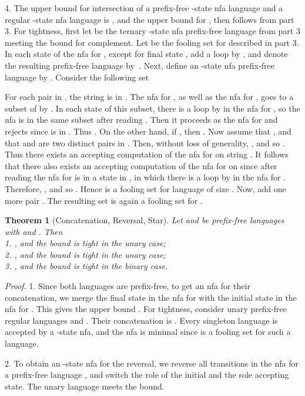 \documentclass[copyright]{eptcs}
\newtheorem{theorem}{Theorem}
\begin{document}
\label{part4}
  4. The upper bound 
  for intersection of a  prefix-free -state nfa language 
  and a  regular -state nfa language
  is , and 
  the upper bound for 
  , then follows from part 3.
  For tightness, first let  be the ternary -state nfa 
  prefix-free language from part 3 meeting the bound  for complement.
  Let  be the fooling set for  described in part 3.
  In each state of the nfa for , except for final state ,
  add a loop by , and denote the resulting prefix-free language by~.
  Next, define an -state nfa prefix-free language 
  by .
  Consider the following set 
  
  For each pair in  ,
  the string  is in  .
  The nfa for , as well as the nfa for ,
  goes to a subset of  by .
  In each state of this subset, there is a loop by  in the nfa for ,
  so the nfa is in the same subset after reading .
  Then it proceeds as the nfa for  and rejects since  is in .
  Thus  . 
  On the other hand, if ,
  then  .
  Now assume that , and that  
  and  are two distinct pairs in .
  Then, without loss of generality, , and so .
  Thus there exists an accepting computation of the nfa for  on  string .
  It follows that there also exists an accepting computation 
  of the nfa for  on 
  since after reading  the nfa for  is in a state in ,
  in which there is a loop by  in the nfa for .
  Therefore,  , and so  .
  Hence  
  is a fooling set for language  of size .
  Now, add one more pair  .
  The resulting set is again a fooling set for .
 \hfill

 \begin{theorem}[Concatenation, Reversal, Star]\label{thm:con,rev,star}
  Let   and 
  be  prefix-free  languages  with  and .
  Then \\
  1. , and the bound is tight in the unary case; \\
  2. , and the bound is tight in the unary case;\\
  3. , and the bound is tight in the binary case.
 \end{theorem}

 \noindent\emph{Proof.}
  1. Since both languages are prefix-free,
  to get an nfa for their concatenation,
  we  merge the final state in the nfa for 
  with the initial state  in the nfa for .
  This gives the upper bound .
  For tightness, consider unary  prefix-free regular languages 
   and .
  Their concatenation  is .
  Every singleton language 
  is accepted by a -state nfa, and the nfa is minimal
  since  
  is a fooling set for such a language.

  2. To obtain an -state nfa for the reversal,
  we reverse all transitions in the nfa for a prefix-free language ,
  and switch the role of the initial and the sole accepting state.
  The unary language  meets the bound.
\end{document}
